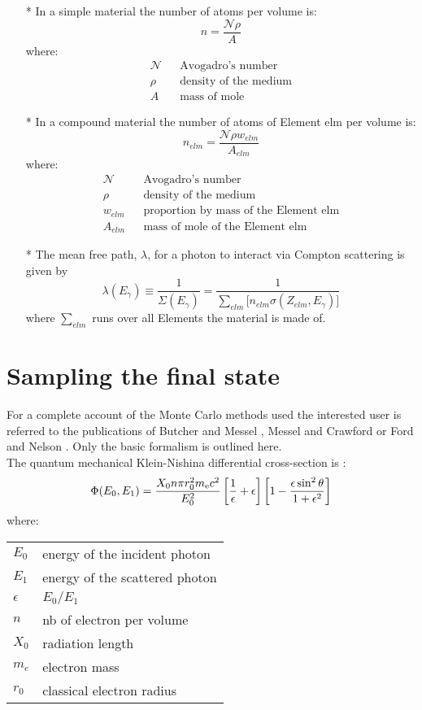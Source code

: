 \begin{itemize}
\item[*]
         In a simple material the number of atoms per volume is:
         \[n  = \frac{\mathcal{N}\rho}{A}\]
         where:
         \begin{eqnarray*}
          \mathcal{N} &  & \mbox{Avogadro's number} \\
          \rho        &  & \mbox{density of the medium} \\
          A           &  & \mbox{mass of mole} 
         \end{eqnarray*}
\item[*]
         In a compound material the number of atoms of Element elm per volume is:
         \[n_{elm}  = \frac{\mathcal{N}\rho w_{elm}}{A_{elm}}\]
         where:
         \begin{eqnarray*}
          \mathcal{N} &  & \mbox{Avogadro's number} \\
          \rho        &  & \mbox{density of the medium} \\
          w_{elm}     &  & \mbox{proportion by mass of the Element elm}\\
          A_{elm}     &  & \mbox{mass of mole of the Element elm} 
         \end{eqnarray*} 
\item[*] 
         The mean free path, $\lambda$, for a photon to interact via Compton
         scattering is given by
         \[
           \lambda(E_{\gamma}) \equiv \frac{1}{\Sigma (E_{\gamma})} 
             = \frac{1}{\sum_{elm}{\lbrack n_{elm} \sigma(Z_{elm},E_{\gamma})\rbrack}}
         \]
         where $\sum_{elm}$ runs over all Elements the material is made of.
\end{itemize}
 
\section {Sampling the final state}
 
For a complete account of the Monte Carlo methods used the
interested user is referred to the publications of Butcher and Messel 
, Messel and Crawford or Ford and Nelson \cite{butch,messel,egs4}.
Only the basic formalism is outlined here.
\\ 
The quantum  mechanical Klein-Nishina differential cross-section
is \cite{klein,egs4}:
\[
\Phi(E_0,E_1) =\frac{X_0 n \pi r_0^2 m_{\rm e}c^2}{E_0^2}
     \left[\frac{1}{\epsilon}+\epsilon\right]
     \left[1 - \frac{\epsilon \sin^2 \theta}{1+\epsilon^2}\right]
\]
where: \quad
\begin{tabular}[t]{l@{\ = \ }l}
$E_0$       & energy of the incident photon   \\
$E_1$       & energy of the scattered photon  \\
$\epsilon$  & $E_0/E_1$                       \\
$n$         & nb of electron per volume       \\
$X_0$       & radiation length                \\
$m_{e}$     & electron mass                   \\
$r_0$       & classical electron radius       
\end{tabular}

